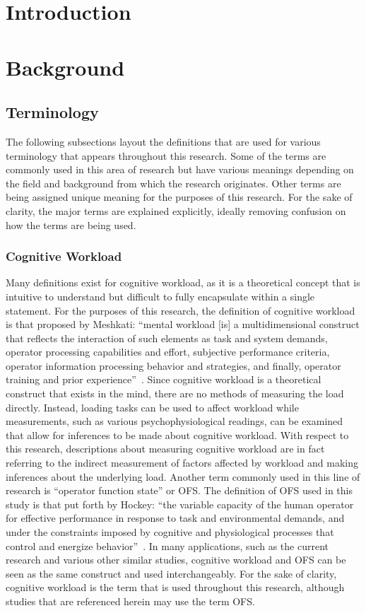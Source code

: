 \documentclass[11pt]{article}
\begin{document}
\section{Introduction}

\section{Background}
	\subsection{Terminology}
	The following subsections layout the definitions that are used for various terminology that appears throughout this research. Some of the terms are commonly used in this area of research but have various meanings depending on the field and background from which the research originates. Other terms are being assigned unique meaning for the purposes of this research. For the sake of clarity, the major terms are explained explicitly, ideally removing confusion on how the terms are being used.
	
		\subsubsection{Cognitive Workload}
		Many definitions exist for cognitive workload, as it is a theoretical concept that is intuitive to understand but difficult to fully encapsulate within a single statement. For the purposes of this research, the definition of cognitive workload is that proposed by Meshkati: ``mental workload [is] a multidimensional construct that reflects the interaction of such elements as task and system demands, operator processing capabilities and effort, subjective performance criteria, operator information processing behavior and strategies, and finally, operator training and prior experience''~\cite{Meshkati}. Since cognitive workload is a theoretical construct that exists in the mind, there are no methods of measuring the load directly. Instead, loading tasks can be used to affect workload while measurements, such as various psychophysiological readings, can be examined that allow for inferences to be made about cognitive workload.  With respect to this research, descriptions about measuring cognitive workload are in fact referring to the indirect measurement of factors affected by workload and making inferences about the underlying load. Another term commonly used in this line of research is ``operator function state'' or OFS. The definition of OFS used in this study is that put forth by Hockey: ``the variable capacity of the human operator for effective performance in response to task and environmental demands, and under the constraints imposed by cognitive and physiological processes that control and energize behavior''~\cite{Hockey}. In many applications, such as the current research and various other similar studies, cognitive workload and OFS can be seen as the same construct and used interchangeably. For the sake of clarity, cognitive workload is the term that is used throughout this research, although studies that are referenced herein may use the term OFS.
		
\end{document}
